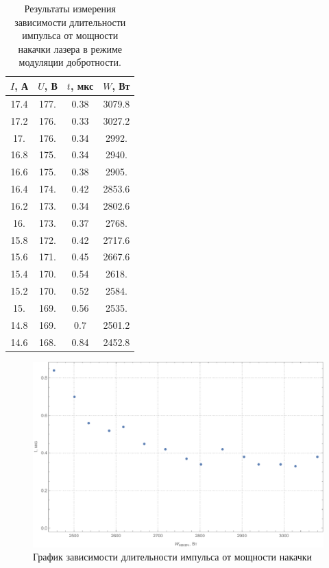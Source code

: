 \documentclass[a4paper, 12pt]{article}
\begin{document}
\begin{table}[!htb]
	\centering
	\caption{Результаты измерения зависимости длительности импульса от мощности накачки лазера в режиме модуляции добротности.}
	\begin{tabular}{|c|c|c|c|}
		\hline
		$I$, А & $U$, В & $t$, мкс & $W$, Вт\\
		\hline
		17.4 & 177. & 0.38 & 3079.8 \\
 17.2 & 176. & 0.33 & 3027.2 \\
 17. & 176. & 0.34 & 2992. \\
 16.8 & 175. & 0.34 & 2940. \\
 16.6 & 175. & 0.38 & 2905. \\
 16.4 & 174. & 0.42 & 2853.6 \\
 16.2 & 173. & 0.34 & 2802.6 \\
 16. & 173. & 0.37 & 2768. \\
 15.8 & 172. & 0.42 & 2717.6 \\
 15.6 & 171. & 0.45 & 2667.6 \\
 15.4 & 170. & 0.54 & 2618. \\
 15.2 & 170. & 0.52 & 2584. \\
 15. & 169. & 0.56 & 2535. \\
 14.8 & 169. & 0.7 & 2501.2 \\
 14.6 & 168. & 0.84 & 2452.8 \\
 \hline
	\end{tabular}
\end{table}
\begin{figure}[!htb]
	\centering
	\includegraphics[width=\textwidth]{3.pdf}
	\caption{График зависимости длительности импульса от мощности накачки}
	\label{timeOfPower}
\end{figure}
\end{document}
